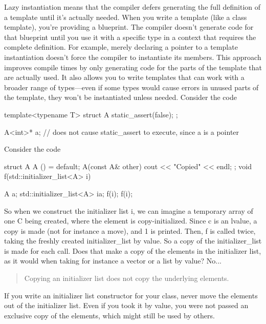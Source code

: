 \documentclass{report}
\begin{document}
\pagebreak 
{}
\bigbreak \noindent 
Lazy instantiation means that the compiler defers generating the full definition of a template until it’s actually needed. 
\bigbreak \noindent 
When you write a template (like a class template), you're providing a blueprint. The compiler doesn’t generate code for that blueprint until you use it with a specific type in a context that requires the complete definition. For example, merely declaring a pointer to a template instantiation doesn’t force the compiler to instantiate its members.
\bigbreak \noindent 
This approach improves compile times by only generating code for the parts of the template that are actually used. It also allows you to write templates that can work with a broader range of types—even if some types would cause errors in unused parts of the template, they won’t be instantiated unless needed.
\bigbreak \noindent 
Consider the code
\bigbreak \noindent 
\begin{cppcode}
template<typename T>
struct A {
    static_assert(false);
};

A<int>* a; // does not cause static_assert to execute, since a is a pointer
\end{cppcode}

\pagebreak 
{}
\bigbreak \noindent 
Consider the code
\bigbreak \noindent 
\begin{cppcode}
    struct A {
        A () = default;
        A(const A& other) { cout << "Copied" << endl; }
    };
    void f(std::initializer_list<A> i) {}

    A a;
    std::initializer_list<A> i{a};
    f(i);
    f(i);
\end{cppcode}
\bigbreak \noindent 
So when we construct the initializer list i, we can imagine a temporary array of one C being created, where the element is copy-initialized. Since c is an lvalue, a copy is made (not for instance a move), and 1 is printed.
\bigbreak \noindent 
Then, f is called twice, taking the freshly created initializer\_list by value. So a copy of the initializer\_list is made for each call. Does that make a copy of the elements in the initializer list, as it would when taking for instance a vector or a list by value? No...
\bigbreak \noindent 
\begin{quote}
    Copying an initializer list does not copy the underlying elements.
\end{quote}
\bigbreak \noindent 
If you write an initializer list constructor for your class, never move the elements out of the initializer list. Even if you took it by value, you were not passed an exclusive copy of the elements, which might still be used by others.
\end{document}
